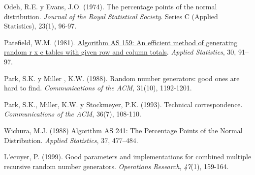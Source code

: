 \documentclass[
]{book}
\newlength{\cslhangindent}
\newlength{\cslentryspacingunit} %
\newenvironment{CSLReferences}[2] %
 {%
  \setlength{\parindent}{0pt}
  \ifodd #1
  \let\oldpar\par
  \def\par{\hangindent=\cslhangindent\oldpar}
  \fi
  \setlength{\parskip}{#2\cslentryspacingunit}
 }%
 {}
\theoremstyle{break}
\theoremstyle{nonumberplain}
\begin{document}
Odeh, R.E. y Evans, J.O. (1974). The percentage points of the normal distribution. \emph{Journal of the Royal Statistical Society}. Series C (Applied Statistics), 23(1), 96-97.

Patefield, W.M. (1981). \href{https://doi.org/10.2307/2346669}{Algorithm AS 159: An efficient method of generating random r x c tables with given row and column totals}. \emph{Applied Statistics}, 30, 91--97.

Park, S.K. y Miller , K.W. (1988). Random number generators: good ones are hard to find. \emph{Communications of the ACM}, 31(10), 1192-1201.

Park, S.K., Miller, K.W. y Stockmeyer, P.K. (1993). Technical correspondence. \emph{Communications of the ACM}, 36(7), 108-110.

Wichura, M.J. (1988) Algorithm AS 241: The Percentage Points of the Normal Distribution. \emph{Applied Statistics}, 37, 477--484.

\hypertarget{refs}{}
\begin{CSLReferences}{1}{0}
\leavevmode{}%
L'ecuyer, P. (1999). Good parameters and implementations for combined multiple recursive random number generators. \emph{Operations Research}, \emph{47}(1), 159-164.

\end{CSLReferences}
\end{document}
